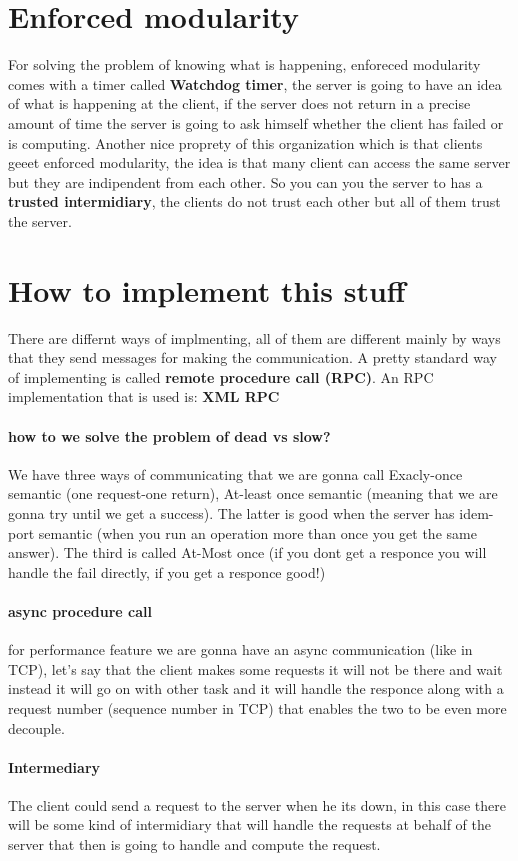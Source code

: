 \documentclass{article}
\begin{document}
  \section{Enforced modularity}
    For solving the problem of knowing what is happening, enforeced modularity comes
    with a timer called \textbf{Watchdog timer}, the server is going to have an idea of what is 
    happening at the client, if the server does not return in a precise amount of time 
    the server is going to ask himself whether the client has failed or is computing.
    Another nice proprety of this organization which is that clients geeet enforced modularity,
    the idea is that many client can access the same server but they are indipendent from each
    other. So you can you the server to has a \textbf{trusted intermidiary}, the clients 
    do not trust each other but all of them trust the server.
  \section{How to implement this stuff}
   There are differnt ways of implmenting, all of them are different mainly by ways that they
   send messages for making the communication. A pretty standard way of implementing is called
   \textbf{remote procedure call (RPC)}. An RPC implementation that is used is: \textbf{XML RPC}
   \paragraph{how to we solve the problem of dead vs slow?} We have three ways of communicating 
     that we are gonna call Exacly-once semantic (one request-one return), At-least once semantic
     (meaning that we are gonna try until we get a success). The latter is good when the 
     server has idem-port semantic (when you run an operation more than once you get the same
     answer). The third is called At-Most once (if you dont get a responce you will handle 
     the fail directly, if you get a responce good!) 
     \paragraph{async procedure call} for performance feature we are gonna have an async 
      communication (like in TCP), let's say that the client makes some requests it will not 
      be there and wait instead it will go on with other task and it will handle the responce
      along with a request number (sequence number in TCP) that enables the two to be even more
      decouple.
    \paragraph{Intermediary} The client could send a request to the server when he its down, in
      this case there will be some kind of intermidiary that will handle the requests at behalf
      of the server that then is going to handle and compute the request.
\end{document}
